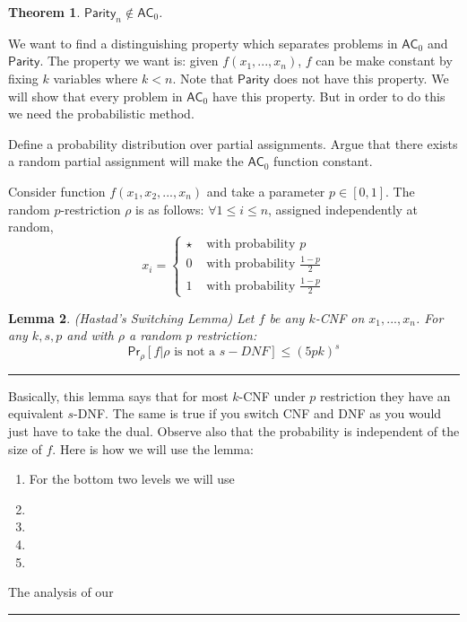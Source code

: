 \documentclass[twoside]{article}
\newcounter{lecnum}
\newtheorem{theorem}{Theorem}[lecnum]
\newtheorem{lemma}[theorem]{Lemma}
\newenvironment{proof}{{\bf Proof:}}{\hfill\rule{2mm}{2mm}}
\def\AC{\mathsf{AC}}
\def\Parity{\mathsf{Parity}}
\begin{document}
\begin{theorem}
$\Parity_n \notin \AC_0$.
\end{theorem}
\begin{proof}
We want to find a distinguishing property which separates problems in $\AC_0$ and $\Parity$. The property we want is: given $f(x_1, ..., x_n)$, $f$ can be make constant by fixing $k$ variables where $k < n$. Note that $\Parity$ does not have this property. We will show that every problem in $\AC_0$ have this property. But in order to do this we need the probabilistic method. 

Define a probability distribution over partial assignments. Argue that there exists a random partial assignment will make the $\AC_0$ function constant.

Consider function $f(x_1, x_2, ..., x_n)$ and take a parameter $p \in [0,1]$. The random $p$-restriction $\rho$ is as follows: $\forall 1 \leq i \leq n$, assigned independently at random, 
\[
x_i = \begin{cases}
\star &\mbox{ with probability } p\\
0 &\mbox{ with probability } \frac{1-p}{2} \\
1 &\mbox{ with probability } \frac{1-p}{2} 
\end{cases}
\]

\begin{lemma}
(Hastad's Switching Lemma) Let $f$ be any $k$-CNF on $x_1, ..., x_n$. For any $k, s, p$ and with $\rho$ a random $p$ restriction:
\[\mathsf{Pr}_{\rho}[f|\rho \mbox{ is not a } s-DNF] \leq (5pk)^s\]
\end{lemma} 
\begin{proof}

\end{proof}

Basically, this lemma says that for most $k$-CNF under $p$ restriction they have an equivalent $s$-DNF. The same is true if you switch CNF and DNF as you would just have to take the dual. Observe also that the probability is independent of the size of $f$. Here is how we will use the lemma:
\begin{enumerate}
\item For the bottom two levels we will use 
\item
\item
\item
\item
\end{enumerate}  

The analysis of our
\end{proof}
\end{document}
